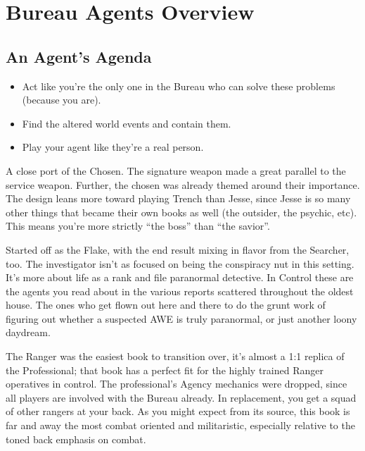 \documentclass[12pt,oneside,landscape]{memoir}
\begin{document}
\chapter*{Bureau Agents Overview}

\begin{multicols}{3}

\begin{tcolorbox}[bottom=4mm,after skip=8mm]
\section*{An Agent's Agenda}
\begin{itemize}

\item Act like you’re the only one in the Bureau who can solve these problems (because you are).
\item Find the altered world events and contain them.
\item Play your agent like they’re a real person.

\end{itemize}
\end{tcolorbox}

{A close port of the Chosen.  The signature weapon made a great parallel to the service weapon.  Further, the chosen was already themed around their importance.  The design leans more toward playing Trench than Jesse, since Jesse is so many other things that became their own books as well (the outsider, the psychic, etc).  This means you’re more strictly “the boss” than “the savior”.}

{Started off as the Flake, with the end result mixing in flavor from the Searcher, too.  The investigator isn’t as focused on being the conspiracy nut in this setting.  It’s more about life as a rank and file paranormal detective.  In Control these are the agents you read about in the various reports scattered throughout the oldest house.  The ones who get flown out here and there to do the grunt work of figuring out whether a suspected AWE is truly paranormal, or just another loony daydream.}

{The Ranger was the easiest book to transition over, it’s almost a 1:1 replica of the Professional; that book has a perfect fit for the highly trained Ranger operatives in control.  The professional’s Agency mechanics were dropped, since all players are involved with the Bureau already.  In replacement, you get a squad of other rangers at your back.  As you might expect from its source, this book is far and away the most combat oriented and militaristic, especially relative to the toned back emphasis on combat.}


\end{multicols}
\end{document}
